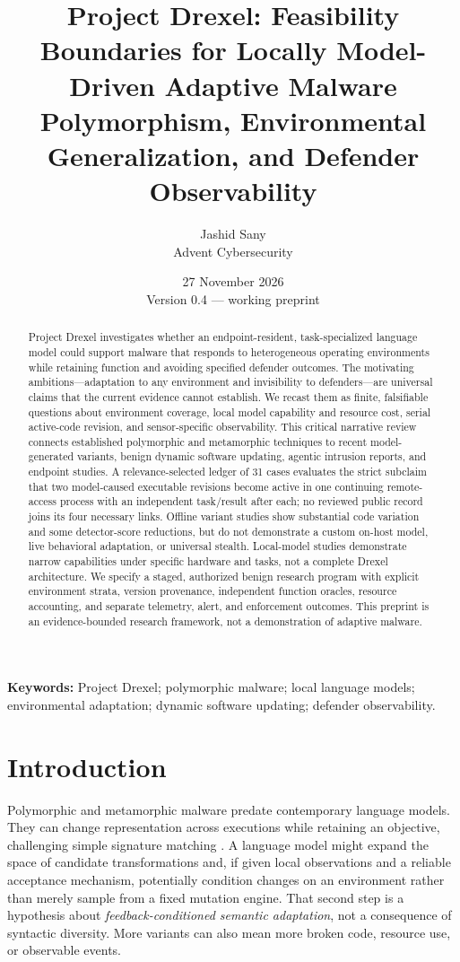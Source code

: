 \documentclass[11pt,letterpaper]{article}
\title{Project Drexel: Feasibility Boundaries for Locally Model-Driven Adaptive Malware\\
\large Polymorphism, Environmental Generalization, and Defender Observability}
\author{Jashid Sany\\\small Advent Cybersecurity}
\date{27 November 2026\\Version 0.4 --- working preprint}
\begin{document}
\maketitle

\begin{abstract}
Project Drexel investigates whether an endpoint-resident, task-specialized language model could support malware that responds to heterogeneous operating environments while retaining function and avoiding specified defender outcomes. The motivating ambitions---adaptation to any environment and invisibility to defenders---are universal claims that the current evidence cannot establish. We recast them as finite, falsifiable questions about environment coverage, local model capability and resource cost, serial active-code revision, and sensor-specific observability. This critical narrative review connects established polymorphic and metamorphic techniques to recent model-generated variants, benign dynamic software updating, agentic intrusion reports, and endpoint studies. A relevance-selected ledger of 31 cases evaluates the strict subclaim that two model-caused executable revisions become active in one continuing remote-access process with an independent task/result after each; no reviewed public record joins its four necessary links. Offline variant studies show substantial code variation and some detector-score reductions, but do not demonstrate a custom on-host model, live behavioral adaptation, or universal stealth. Local-model studies demonstrate narrow capabilities under specific hardware and tasks, not a complete Drexel architecture. We specify a staged, authorized benign research program with explicit environment strata, version provenance, independent function oracles, resource accounting, and separate telemetry, alert, and enforcement outcomes. This preprint is an evidence-bounded research framework, not a demonstration of adaptive malware.
\end{abstract}

\noindent\textbf{Keywords:} Project Drexel; polymorphic malware; local language models; environmental adaptation; dynamic software updating; defender observability.

\section{Introduction}

Polymorphic and metamorphic malware predate contemporary language models. They can change representation across executions while retaining an objective, challenging simple signature matching \cite{mitrepoly,waveatlas}. A language model might expand the space of candidate transformations and, if given local observations and a reliable acceptance mechanism, potentially condition changes on an environment rather than merely sample from a fixed mutation engine. That second step is a hypothesis about \emph{feedback-conditioned semantic adaptation}, not a consequence of syntactic diversity. More variants can also mean more broken code, resource use, or observable events.
\end{document}
